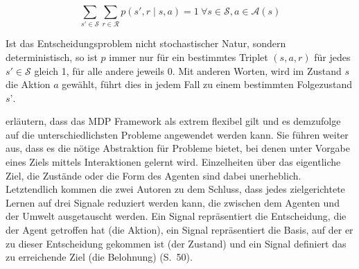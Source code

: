 \begin{equation}\label{eq:wahrscheinlichkeitsverteilung}
\sum_{s' \in \mathcal{S}} \sum_{r \in \mathcal{R}} p(s', r \mid s,a) = 1 \ \forall s \in \mathcal{S}, a \in \mathcal{A}(s)
\end{equation}

Ist das Entscheidungsproblem nicht stochastischer Natur, sondern deterministisch, so ist $p$ immer nur für ein bestimmtes Triplet $(s,a,r)$ für jedes $s' \in \mathcal{S}$ gleich 1, für alle andere jeweils 0. Mit anderen Worten, wird im Zustand $s$ die Aktion $a$ gewählt, führt dies in jedem Fall zu einem bestimmten Folgezustand $s’$. 
\par 

\cite{Sutton1998} erläutern, dass das MDP Framework als extrem flexibel gilt und es demzufolge auf die unterschiedlichsten Probleme angewendet werden kann. Sie führen weiter aus, dass es die nötige Abstraktion für Probleme bietet, bei denen unter Vorgabe eines Ziels mittels Interaktionen gelernt wird. Einzelheiten über das eigentliche Ziel, die Zustände oder die Form des Agenten sind dabei unerheblich. 
Letztendlich kommen die zwei Autoren zu dem Schluss, dass \glqq jedes zielgerichtete Lernen auf drei Signale reduziert werden kann, die zwischen dem Agenten und der Umwelt ausgetauscht werden. Ein Signal repräsentiert die Entscheidung, die der Agent getroffen hat (die Aktion), ein Signal repräsentiert die Basis, auf der er zu dieser Entscheidung gekommen ist (der Zustand) und ein Signal definiert das zu erreichende Ziel (die Belohnung)\grqq{} (S.~50).

